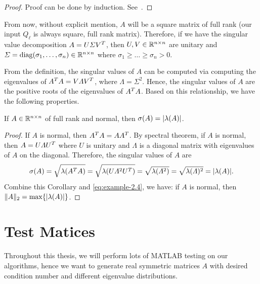 \begin{proof}
    Proof can be done by induction. See~.
\end{proof}

From now, without explicit mention, $A$ will be a square matrix of full rank (our input $Q_\ell$ is always square, full rank matrix). Therefore, if we have the singular value decomposition $A = U\varSigma V^T$, then $U,V\in\mathbb{R}^{n\times n}$ are unitary and $\varSigma = \mathrm{diag}(\sigma_1,\dots,\sigma_n)\in\mathbb{R}^{n\times n}$ where $\sigma_1\geq \dots \geq \sigma_n > 0$. 

From the definition, the singular values of $A$ can be computed via computing the eigenvalues of $A^T A = V\varLambda V^T$, where $\varLambda = \Sigma^2$. Hence, the singular values of $A$ are the positive roots of the eigenvalues of $A^T A$. Based on this relationship, we have the following properties.

\begin{corollary}\label{col.2norm}
    If $A\in\mathbb{R}^{n\times n}$ of full rank and normal, then $\sigma(A) = \lvert\lambda(A)\rvert$.
\end{corollary}

\begin{proof}
  If $A$ is normal, then $A^T A = AA^T$. By spectral theorem, if $A$ is normal, then $A = U\varLambda U^T$ where $U$ is unitary and $\varLambda$ is a diagonal matrix with eigenvalues of $A$ on the diagonal. Therefore, the singular values of $A$ are 
    \begin{equation}\notag
        \sigma(A) = \sqrt{\lambda(A^T A)} = \sqrt{\lambda(U\varLambda ^2U^T)} = \sqrt{\lambda(\varLambda^2)} = \sqrt{\lambda(\varLambda)^2} = \lvert\lambda(A)\rvert.
    \end{equation}
    Combine this Corollary and \eqref{eq:example-2.4}, we have: if $A$ is normal, then $\|{A}\|_2 = \max\{\lvert\lambda(A)\rvert\}$.
\end{proof}


\section{Test Matices}\label{sec:test-matrices}
Throughout this thesis, we will perform lots of MATLAB testing on our algorithms, hence we want to generate real symmetric matrices $A$ with desired condition number and different eigenvalue distributions.

